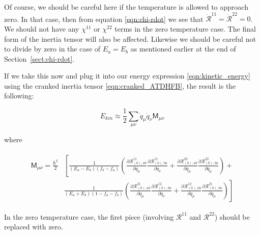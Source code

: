 \noindent Of course, we should be careful here if the temperature is allowed to approach zero. In that case, then from equation \eqref{eqn:chi-rdot} we see that $\mathcal{\dot{R}}^{11}=\mathcal{\dot{R}}^{22}=0$. We should not have any $\chi^{11}$ or $\chi^{22}$ terms in the zero temperature case. The final form of the inertia tensor will also be affected. Likewise we should be careful not to divide by zero in the case of $E_a=E_b$ as mentioned earlier at the end of Section~\ref{sect:chi-rdot}.%

If we take this now and plug it into our energy expression \eqref{eqn:kinetic_energy} using the cranked inertia tensor \eqref{eqn:cranked_ATDHFB}, the result is the following:

\begin{tcolorbox}
	\begin{equation}
	E_{kin} \approx \frac{1}{2}\sum_{\mu\nu}\dot{q}_\mu\dot{q}_\nu\mathsf{M}_{\mu\nu}
	\end{equation}
\end{tcolorbox}

\noindent where

\begin{tcolorbox}
	\begin{align}\label{crankedFiniteTempInertia}
	\begin{aligned}
	\mathsf{M}_{\mu\nu} =  \frac{\hbar^2}{2}&\left[\frac{1}{(E_a-E_b)(f_b-f_a)}\left(\frac{\partial\mathcal{R}^{11}_{(0),ab}}{\partial q_\mu}\frac{\partial\mathcal{R}^{11}_{(0),ba}}{\partial q_\nu}+\frac{\partial\mathcal{R}^{22}_{(0),ab}}{\partial q_\mu}\frac{\partial\mathcal{R}^{22}_{(0),ba}}{\partial q_\mu}\right)\right.+ \\
	&\left.\frac{1}{(E_a+E_b)(1-f_a-f_b)}\left(\frac{\partial\mathcal{R}^{21}_{(0),ab}}{\partial q_\mu}\frac{\partial\mathcal{R}^{12}_{(0),ba}}{\partial q_\nu}+\frac{\partial\mathcal{R}^{12}_{(0),ab}}{\partial q_\mu}\frac{\partial\mathcal{R}^{21}_{(0),ba}}{\partial q_\mu}\right)\right]
	\end{aligned}
	\end{align}
\end{tcolorbox}

\noindent In the zero temperature case, the first piece (involving $\mathcal{R}^{11}$ and $\mathcal{R}^{22}$) should be replaced with zero.

